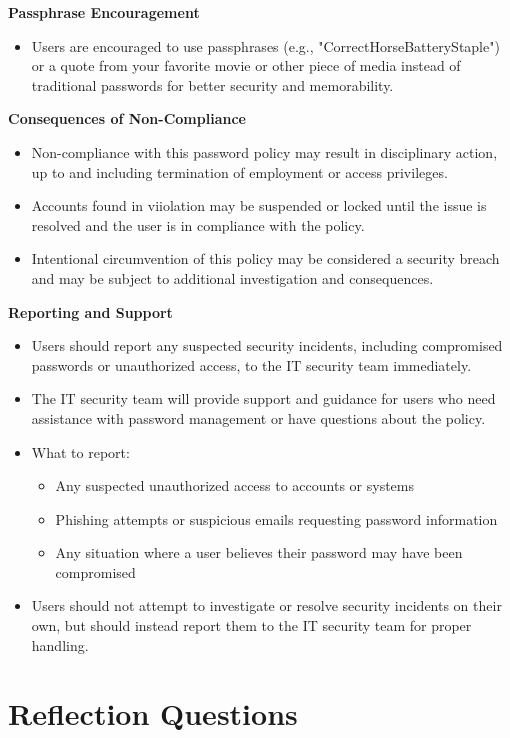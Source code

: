 \documentclass[12pt]{article}
\begin{document}
\textbf{Passphrase Encouragement}
\begin{itemize}
	\item Users are encouraged to use passphrases (e.g., "CorrectHorseBatteryStaple") or a quote from your favorite movie or other piece of media instead of traditional passwords for better security and memorability.
\end{itemize}
\textbf{Consequences of Non-Compliance}
\begin{itemize}
	\item Non-compliance with this password policy may result in disciplinary action, up to and including termination of employment or access privileges.
	\item Accounts found in viiolation may be suspended or locked until the issue is resolved and the user is in compliance with the policy.
	\item Intentional circumvention of this policy may be considered a security breach and may be subject to additional investigation and consequences.
\end{itemize}
\newpage
\noindent\textbf{Reporting and Support}
\begin{itemize}
	\item Users should report any suspected security incidents, including compromised passwords or unauthorized access, to the IT security team immediately.
	\item The IT security team will provide support and guidance for users who need assistance with password management or have questions about the policy.
	\item What to report:
	\begin{itemize}
		\item Any suspected unauthorized access to accounts or systems
		\item Phishing attempts or suspicious emails requesting password information
		\item Any situation where a user believes their password may have been compromised
	\end{itemize}
	\item Users should not attempt to investigate or resolve security incidents on their own, but should instead report them to the IT security team for proper handling.
\end{itemize}

\newpage
\section{Reflection Questions}
\end{document}
